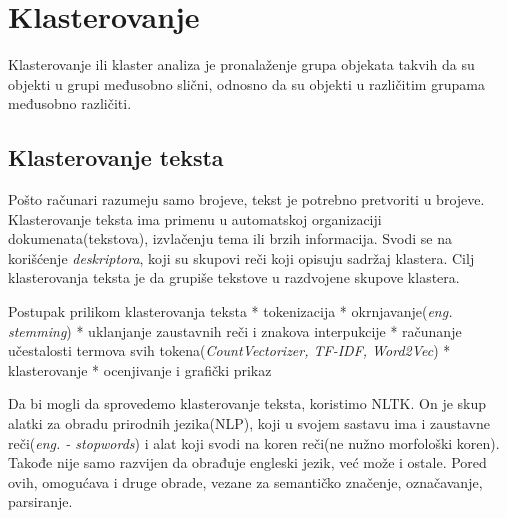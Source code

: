 \documentclass[11pt]{article}
\begin{document}
    \hypertarget{klasterovanje}{%
\section{Klasterovanje }\label{klasterovanje}}

Klasterovanje ili klaster analiza je pronalaženje grupa objekata takvih
da su objekti u grupi međusobno slični, odnosno da su objekti u
različitim grupama međusobno različiti.

    \hypertarget{klasterovanje-teksta}{%
\subsection{Klasterovanje teksta }\label{klasterovanje-teksta}}

Pošto računari razumeju samo brojeve, tekst je potrebno pretvoriti u
brojeve. Klasterovanje teksta ima primenu u automatskoj organizaciji
dokumenata(tekstova), izvlačenju tema ili brzih informacija. Svodi se na
korišćenje \emph{deskriptora}, koji su skupovi reči koji opisuju sadržaj
klastera. Cilj klasterovanja teksta je da grupiše tekstove u razdvojene
skupove klastera.

Postupak prilikom klasterovanja teksta * tokenizacija *
okrnjavanje(\emph{eng. stemming}) * uklanjanje zaustavnih reči i znakova
interpukcije * računanje učestalosti termova svih
tokena(\emph{CountVectorizer, TF-IDF, Word2Vec}) * klasterovanje *
ocenjivanje i grafički prikaz

    Da bi mogli da sprovedemo klasterovanje teksta, koristimo NLTK. On je
skup alatki za obradu prirodnih jezika(NLP), koji u svojem sastavu ima i
zaustavne reči(\emph{eng. - stopwords}) i alat koji svodi na koren
reči(ne nužno morfološki koren). Takođe nije samo razvijen da obrađuje
engleski jezik, već može i ostale. Pored ovih, omogućava i druge obrade,
vezane za semantičko značenje, označavanje, parsiranje.
\end{document}

